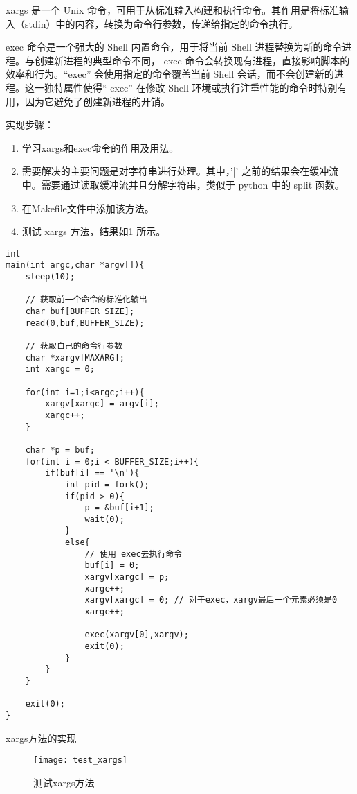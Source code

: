 xargs 是一个 Unix 命令，可用于从标准输入构建和执行命令。其作用是将标准输入（stdin）中的内容，转换为命令行参数，传递给指定的命令执行。

exec 命令是一个强大的 Shell 内置命令，用于将当前 Shell 进程替换为新的命令进程。与创建新进程的典型命令不同， exec 命令会转换现有进程，直接影响脚本的效率和行为。“exec” 会使用指定的命令覆盖当前 Shell 会话，而不会创建新的进程。这一独特属性使得“ exec” 在修改 Shell 环境或执行注重性能的命令时特别有用，因为它避免了创建新进程的开销。

实现步骤：
\begin{enumerate}
	\item 学习xargs和exec命令的作用及用法。
	\item 需要解决的主要问题是对字符串进行处理。其中，'|' 之前的结果会在缓冲流中。需要通过读取缓冲流并且分解字符串，类似于 python 中的 split 函数。
	\item 在Makefile文件中添加该方法。
	\item 测试 xargs 方法，结果如\cref{fig:test_xargs} 所示。
\end{enumerate}

\begin{listing}[!htb]
	\begin{verbatim}
int
main(int argc,char *argv[]){
    sleep(10);
    
    // 获取前一个命令的标准化输出
    char buf[BUFFER_SIZE];
    read(0,buf,BUFFER_SIZE);

    // 获取自己的命令行参数
    char *xargv[MAXARG];
    int xargc = 0;

    for(int i=1;i<argc;i++){
        xargv[xargc] = argv[i];
        xargc++;
    }

    char *p = buf;
    for(int i = 0;i < BUFFER_SIZE;i++){
        if(buf[i] == '\n'){
            int pid = fork();
            if(pid > 0){
                p = &buf[i+1];
                wait(0);
            }
            else{
                // 使用 exec去执行命令
                buf[i] = 0;
                xargv[xargc] = p;
                xargc++;
                xargv[xargc] = 0; // 对于exec，xargv最后一个元素必须是0
                xargc++;

                exec(xargv[0],xargv);
                exit(0);
            }
        }
    }

    exit(0);
}
	\end{verbatim}
	\caption{xargs方法的实现}\label{lst:xargs}
\end{listing}

\begin{figure}[!htb]
	\centering
	\texttt{[image: test\_xargs]}
	\caption{测试xargs方法}
	\label{fig:test_xargs}
\end{figure}

